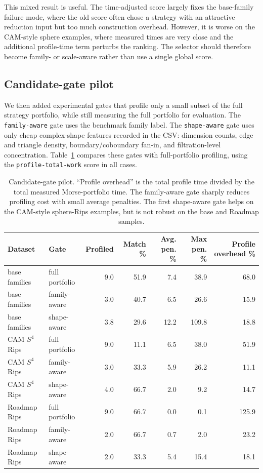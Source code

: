 \documentclass[11pt]{article}
\begin{document}
This mixed result is useful.  The time-adjusted score largely fixes the base-family
failure mode, where the old score often chose a strategy with an attractive reduction input
but too much construction overhead.  However, it is worse on the CAM-style sphere examples,
where measured times are very close and the additional profile-time term perturbs the
ranking.  The selector should therefore become family- or scale-aware rather than use a
single global score.

\subsection{Candidate-gate pilot}
We then added experimental gates that profile only a small subset of the full strategy
portfolio, while still measuring the full portfolio for evaluation.  The
\texttt{family-aware} gate uses the benchmark family label.  The \texttt{shape-aware} gate
uses only cheap complex-shape features recorded in the CSV: dimension counts, edge and
triangle density, boundary/coboundary fan-in, and filtration-level concentration.
Table~\ref{tab:profile-gate} compares these gates with full-portfolio profiling, using the
\texttt{profile-total-work} score in all cases.

\begin{table}[ht]
\centering
\scriptsize
\setlength{\tabcolsep}{3pt}
\begin{tabular}{llrrrrr}
\toprule
Dataset & Gate & Profiled & Match \% & Avg. pen. \% & Max pen. \% & Profile overhead \% \\
\midrule
base families & full portfolio & 9.0 & 51.9 & 7.4 & 38.9 & 68.0 \\
base families & family-aware   & 3.0 & 40.7 & 6.5 & 26.6 & 15.9 \\
base families & shape-aware    & 3.8 & 29.6 & 12.2 & 109.8 & 18.8 \\
\midrule
CAM $S^4$ Rips & full portfolio & 9.0 & 11.1 & 6.5 & 38.0 & 51.9 \\
CAM $S^4$ Rips & family-aware   & 3.0 & 33.3 & 5.9 & 26.2 & 11.1 \\
CAM $S^4$ Rips & shape-aware    & 4.0 & 66.7 & 2.0 & 9.2 & 14.7 \\
\midrule
Roadmap Rips & full portfolio & 9.0 & 66.7 & 0.0 & 0.1 & 125.9 \\
Roadmap Rips & family-aware   & 2.0 & 66.7 & 0.7 & 2.0 & 23.2 \\
Roadmap Rips & shape-aware    & 2.0 & 33.3 & 5.4 & 15.4 & 18.1 \\
\bottomrule
\end{tabular}
\caption{Candidate-gate pilot.  ``Profile overhead'' is the total profile time divided by
the total measured Morse-portfolio time.  The family-aware gate sharply reduces profiling
cost with small average penalties.  The first shape-aware gate helps on the CAM-style
sphere-Rips examples, but is not robust on the base and Roadmap samples.}
\label{tab:profile-gate}
\end{table}
\end{document}
